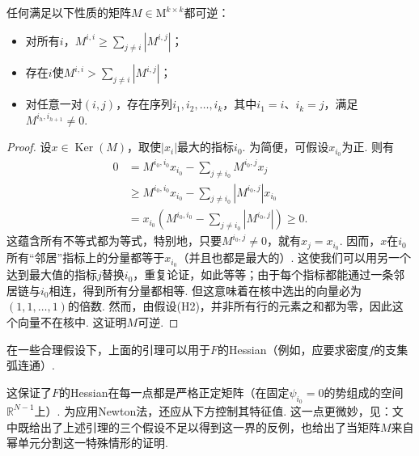 \begin{lemma}\label{obj:6.5}
任何满足以下性质的矩阵$M\in\mathrm M^{k\times k}$都可逆：
\begin{itemize}
\item[(H1)] 对所有$i$，$M^{i,i}\ge\sum_{j\ne i}|M^{i,j}|$；
\item[(H2)] 存在$i$使$M^{i,i}>\sum_{j\ne i}|M^{i,j}|$；
\item[(H3)] 对任意一对$(i,j)$，存在序列$i_1,i_2,\ldots,i_k$，其中$i_1=i$、$i_k=j$，满足$M^{i_h,i_{h+1}}\ne0$.
\end{itemize}
\end{lemma}
\begin{proof}
设$x\in\operatorname{Ker}(M)$，取使$|x_i|$最大的指标$i_0$. 为简便，可假设$x_{i_0}$为正. 则有
\[
\begin{aligned}
0&=M^{i_0,i_0}x_{i_0}-\sum_{j\ne i_0}M^{i_0,j}x_j\\
&\ge M^{i_0,i_0}x_{i_0}-\sum_{j\ne i_0}|M^{i_0,j}|x_{i_0}\\
&=x_{i_0}\left(M^{i_0,i_0}-\sum_{j\ne i_0}|M^{i_0,j}|\right)\ge0.
\end{aligned}
\]
这蕴含所有不等式都为等式，特别地，只要$M^{i_0,j}\ne0$，就有$x_j=x_{i_0}$. 因而，$x$在$i_0$所有“邻居”指标上的分量都等于$x_{i_0}$（并且也都是最大的）. 这使我们可以用另一个达到最大值的指标$j$替换$i_0$，重复论证，如此等等；由于每个指标都能通过一条邻居链与$i_0$相连，得到所有分量都相等. 但这意味着在核中选出的向量必为$(1,1,\ldots,1)$的倍数. 然而，由假设(H2)，并非所有行的元素之和都为零，因此这个向量不在核中. 这证明$M$可逆.
\end{proof}

在一些合理假设下，上面的引理可以用于$F$的Hessian（例如，应要求密度$f$的支集弧连通）.

这保证了$F$的Hessian在每一点都是严格正定矩阵（在固定$\psi_{i_0}=0$的势组成的空间$\mathbb R^{N-1}$上）. 为应用Newton法，还应从下方控制其特征值. 这一点更微妙，见\cite{b114}：文中既给出了上述引理的三个假设不足以得到这一界的反例，也给出了当矩阵$M$来自幂单元分割这一特殊情形的证明.

